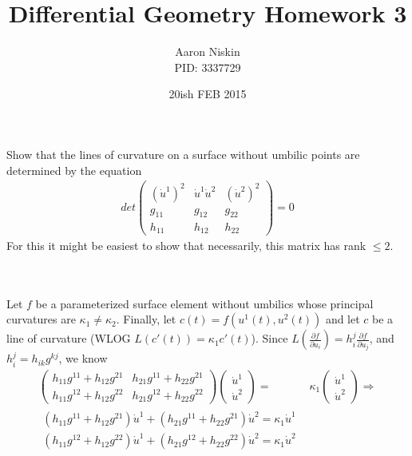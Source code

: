 \documentclass[12pt]{amsart}
\newcommand{\parti}[2]{\frac{\partial #1}{\partial #2}}
\begin{document}
\title{Differential Geometry Homework 3}
\author{Aaron Niskin \\PID: 3337729}
\date{20ish FEB 2015}
\maketitle

\section{}Show that the lines of curvature on a surface without umbilic points are determined by the equation
\begin{align*}det\left(\begin{array}{ccc}
	(\dot u^1)^2 & \dot u^1\dot u^2 & (\dot u^2)^2
	\\g_{11} & g_{12} & g_{22}
	\\h_{11} & h_{12} & h_{22}
\end{array}\right)=0
\end{align*}
For this it might be easiest to show that necessarily, this matrix has rank $\leq2$.
\\
\\
\\
\par Let $f$ be a parameterized surface element without umbilics whose principal curvatures are $\kappa_1\neq \kappa_2$. Finally, let $c(t)=f(u^1(t),u^2(t))$ and let $c$ be a line of curvature (WLOG $L(c'(t))=\kappa_1c'(t)$). Since $L(\parti{f}{u_i})=h_i^j\parti{f}{u_j}$, and $h_i^j=h_{ik}g^{kj}$, we know
\begin{align*}
	\left(\begin{array}{cc}
		h_{11}g^{11}+h_{12}g^{21} & h_{21}g^{11}+h_{22}g^{21}
		\\h_{11}g^{12}+h_{12}g^{22} & h_{21}g^{12}+h_{22}g^{22}
	\end{array}\right)
	\left(\begin{array}{c}
		\dot u^1
		\\\dot u^2
	\end{array}\right)=&
	\kappa_1\left(\begin{array}{c}
		\dot u^1
		\\\dot u^2
	\end{array}\right)\Rightarrow
	\\
	\begin{array}{c}
		(h_{11}g^{11}+h_{12}g^{21})\dot u^1+(h_{21}g^{11}+h_{22}g^{21})\dot u^2=\kappa_1\dot u^1
		\\(h_{11}g^{12}+h_{12}g^{22})\dot u^1+(h_{21}g^{12}+h_{22}g^{22})\dot u^2=\kappa_1\dot u^2
	\end{array}
\end{align*}
\end{document}
